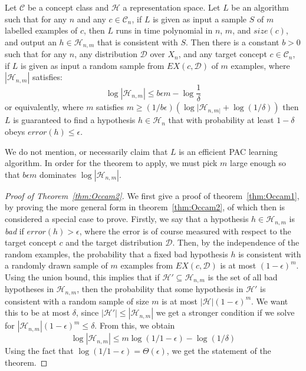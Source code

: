 \begin{theorem}\label{thm:Occam2}
    Let $\mathcal{C}$ be a concept class and $\mathcal{H}$ a representation space. Let $L$ be an algorithm such that for any $n$ and any $c\in \mathcal{C}_{n}$, if $L$ is given as input a sample $S$ of $m$ labelled examples of $c$, then $L$ runs in time polynomial in $n$, $m$, and $size(c)$, and output an $h\in \mathcal{H}_{n,m}$ that is consistent with $S$. Then there is a constant $b>0$ such that for any $n$, any distribution $\mathcal{D}$ over $X_{n}$, and any target concept $c\in \mathcal{C}_{n}$, if $L$ is given as input a random sample from $EX(c,\mathcal{D})$ of $m$ examples, where $|\mathcal{H}_{n,m}|$ satisfies: 
    \begin{equation}
        \log{|\mathcal{H}_{n,m}|} \leq b \epsilon m - \log{\frac{1}{\delta}}
    \end{equation} 
    or equivalently, where $m$ satisfies $m\geq (1/b\epsilon)(\log{|\mathcal{H}_{n,m|}}+ \log{(1/\delta)})$ then $L$ is guaranteed to find a hypothesis $h\in \mathcal{H}_{n}$ that with probability at least $1-\delta$ obeys $error(h)\leq \epsilon$. 
\end{theorem}
We do not mention, or necessarily claim that $L$ is an efficient PAC learning algorithm. In order for the theorem to apply, we must pick $m$ large enough so that $b\epsilon m$ dominates $\log{|\mathcal{H}_{n,m}|}$. 

\begin{proof}[Proof of Theorem~\ref{thm:Occam2}]
    We first give a proof of theorem~\ref{thm:Occam1}, by proving the more general form in theorem~\ref{thm:Occam2}, of which then is considered a special case to prove. Firstly, we say that a hypothesis $h\in \mathcal{H}_{n,m}$ is \textit{bad} if $error(h)>\epsilon$, where the error is of course measured with respect to the target concept $c$ and the target distribution $\mathcal{D}$. Then, by the independence of the random examples, the probability that a fixed bad hypothesis $h$ is consistent with a randomly drawn sample of $m$ examples from $EX(c,\mathcal{D})$ is at most $(1-\epsilon)^{m}$. Using the union bound, this implies that if $\mathcal{H}'\subseteq \mathcal{H}_{n,m}$ is the set of all bad hypotheses in $\mathcal{H}_{n,m}$, then the probability that some hypothesis in $\mathcal{H}'$ is consistent with a random sample of size $m$ is at most $|\mathcal{H}|(1-\epsilon)^{m}$. We want this to be at most $\delta$, since $|\mathcal{H}'|\leq |\mathcal{H}_{n,m}|$ we get a stronger condition if we solve for $|\mathcal{H}_{n,m}|(1-\epsilon)^{m}\leq \delta$. From this, we obtain 
    \begin{equation}
        \log{|\mathcal{H}_{n,m}|} \leq m \log{(1/1-\epsilon)} - \log{(1/\delta)}
    \end{equation}
    Using the fact that $\log{(1/1-\epsilon)}=\Theta(\epsilon)$, we get the statement of the theorem. 
\end{proof}

